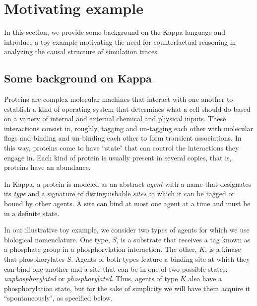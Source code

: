 
\section{Motivating example}\label{sec:example}

In this section, we provide some background on the Kappa language and
introduce a toy example motivating the need for counterfactual
reasoning in analyzing the causal structure of simulation traces.


\subsection{Some background on Kappa}\label{sec:background}

Proteins are complex molecular machines that interact with one another
to establish a kind of operating system that determines what a cell
should do based on a variety of internal and external chemical and
physical inputs. These interactions consist in, roughly, tagging and
un-tagging each other with molecular flags and binding and un-binding
each other to form transient associations. In this way, proteins come
to have ``state" that can control the interactions they engage
in. Each kind of protein is usually present in several copies, that
is, proteins have an abundance.
 
In Kappa, a protein is modeled as an abstract \emph{agent} with a name
that designates its \emph{type} and a signature of distinguishable
\emph{sites} at which it can be tagged or bound by other agents. A
site can bind at most one agent at a time and must be in a definite
state.

In our illustrative toy example, we consider two types of agents for
which we use biological nomenclature. One type, $S$, is a substrate
that receives a tag known as a phosphate group in a phosphorylation
interaction. The other, $K$, is a kinase that phosphorylates
$S$. Agents of both types feature a binding site at which they can
bind one another and a site that can be in one of two possible states:
\emph{unphosphorylated} or \emph{phosphorylated}. Thus, agents of type
$K$ also have a phosphorylation state, but for the sake of simplicity
we will have them acquire it ``spontaneously", as specified below.

